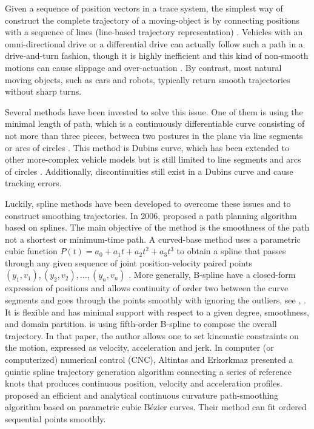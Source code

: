 Given a sequence of position vectors in a trace system, the simplest way of construct the complete trajectory of a moving-object is by connecting positions with a sequence of lines (line-based trajectory representation) \cite{agarwal2003indexing}. Vehicles with an omni-directional drive or a differential drive can actually follow such a path in a drive-and-turn fashion, though it is highly inefficient \cite{gloderer2010spline} and this kind of non-smooth motions can cause slippage and over-actuation \cite{magid2006spline}. By contrast, most natural moving objects, such as cars and robots, typically return smooth trajectories without sharp turns. 

Several methods have been invested to solve this issue. One of them is using the minimal length of path, which is a continuously differentiable curve consisting of not more than three pieces,  between two postures in the plane via line segments or arcs of circles \cite{dubins1957curves}. This method is Dubins curve, which has been extended to other more-complex vehicle models but is still limited to line segments and arcs of circles \cite{yang2010analytical}. Additionally, discontinuities still exist in a Dubins curve and cause tracking errors. 

Luckily, spline methods have been developed to overcome these issues and to construct smoothing trajectories.  In 2006, \cite{magid2006spline} proposed a path planning algorithm based on splines. The main objective of the method is the smoothness of the path not a shortest or minimum-time path. A curved-base method uses a parametric cubic function $P(t)=a_0+a_1t+a_2t^2+a_3t^3$ to obtain a spline that passes through any given sequence of joint position-velocity paired points $(y_1, v_1), (y_2, v_2), \ldots, (y_n,v_n)$ \cite{yu2004curve}. More generally, B-spline have a closed-form expression of positions and allows continuity of order two between the curve segments and goes through the points smoothly with ignoring the outliers, see \eg \cite{komoriya1989trajectory}, \cite{ben2004geometric}. It is flexible and has minimal support with respect to a given degree, smoothness, and domain partition. \cite{gasparetto2007new} is using fifth-order B-spline to compose the overall trajectory. In that paper, the author allows one to set kinematic constraints on the motion, expressed as velocity, acceleration and jerk. In computer (or computerized) numerical control (CNC), Altintas and Erkorkmaz \cite{erkorkmaz2001high} presented a quintic spline trajectory generation algorithm connecting a series of reference knots that produces continuous position, velocity and acceleration profiles. \cite{yang2010analytical} proposed an efficient and analytical continuous curvature path-smoothing algorithm based on parametric cubic B\'{e}zier curves. Their method can fit ordered sequential points smoothly. 


